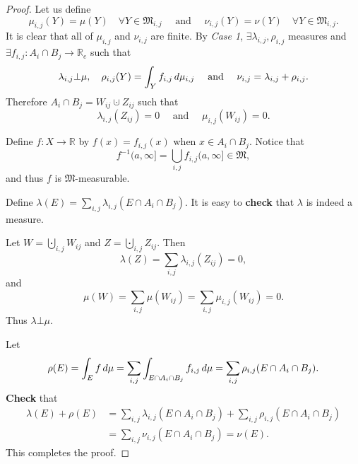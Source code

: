 \documentclass[notoc,notitlepage]{tufte-book}
\begin{document}
\begin{proof}
  Let us define
  \begin{equation*}
    \mu_{i, j}(Y) = \mu(Y)\quad \forall Y \in \mathfrak{M}_{i, j} \quad \text{ and }\quad
    \nu_{i, j}(Y) = \nu(Y)\quad \forall Y \in \mathfrak{M}_{i, j}.
  \end{equation*}
  It is clear that all of $\mu_{i, j}$ and $\nu_{i, j}$ are finite.
  By \textit{Case 1}, $\exists \lambda_{i,j}, \rho_{i,j}$ measures
  and $\exists f_{i,j} : A_i \cap B_j \to \mathbb{R}_e$ such that
  \begin{equation*}
    \lambda_{i,j} \bot \mu,\quad \rho_{i,j}(Y) = \int_{Y} f_{i,j} \mathop{}\!d{\mu_{i,j}}
    \quad\text{ and }\quad \nu_{i,j} = \lambda_{i,j} + \rho_{i,j}.
  \end{equation*}
  Therefore $A_i \cap B_j = W_{ij} \cupdot Z_{ij}$ such that
  \begin{equation*}
    \lambda_{i,j}(Z_{ij}) = 0 \quad\text{ and }\quad \mu_{i,j}(W_{ij}) = 0.
  \end{equation*}

  Define $f : X \to \mathbb{R}$ by $f(x) = f_{i,j}(x)$ when $x \in A_i \cap B_j$.
  Notice that
  \begin{equation*}
    f^{-1}(a, \infty] = \bigcup_{i,j} f_{i,j}(a, \infty] \in \mathfrak{M},
  \end{equation*}
  and thus $f$ is $\mathfrak{M}$-measurable.

  Define $\lambda(E) = \sum_{i,j} \lambda_{i,j}(E \cap A_i \cap B_j)$.
  It is easy to \textbf{check} that $\lambda$ is indeed a measure.

  Let $W = \bigcupdot_{i,j} W_{ij}$ and $Z = \bigcupdot_{i,j} Z_{ij}$.
  Then
  \begin{equation*}
    \lambda(Z) = \sum_{i,j} \lambda_{i,j}(Z_{ij}) = 0,
  \end{equation*}
  and
  \begin{equation*}
    \mu(W) = \sum_{i,j} \mu(W_{ij}) = \sum_{i,j} \mu_{i,j} (W_{ij}) = 0.
  \end{equation*}
  Thus $\lambda \bot \mu$.

  Let
  \begin{equation*}
    \rho(E) = \int_{E} f \mathop{}\!d{\mu}
          = \sum_{i,j} \int_{E \cap A_i \cap B_j} f_{i,j} \mathop{}\!d{\mu}
          = \sum_{i,j} \rho_{i,j}(E \cap A_i \cap B_j).
  \end{equation*}
  \textbf{Check} that
  \begin{align*}
    \lambda(E) + \rho(E)
    &= \sum_{i,j} \lambda_{i,j} (E \cap A_i \cap B_j)
      + \sum_{i,j} \rho_{i,j}(E \cap A_i \cap B_j) \\
    &= \sum_{i,j} \nu_{i,j}(E \cap A_i \cap B_j) = \nu(E).
  \end{align*}
  This completes the proof.
\end{proof}
\end{document}
